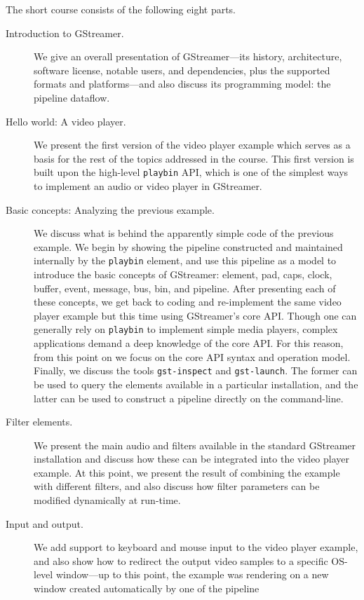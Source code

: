 \documentclass{sig-alternate-05-2015}
\begin{document}
The short course consists of the following eight parts.
\begin{description}
\item[Introduction to GStreamer.] We give an overall presentation of
  GStreamer---its history, architecture, software license, notable users,
  and dependencies, plus the supported formats and platforms---and also
  discuss its programming model: the pipeline dataflow.
\item[Hello world: A video player.]  We present the first version of the
  video player example which serves as a basis for the rest of the topics
  addressed in the course.  This first version is built upon the high-level
  \texttt{playbin} API, which is one of the simplest ways to implement an
  audio or video player in GStreamer.
\item[Basic concepts: Analyzing the previous example.] We discuss what is
  behind the apparently simple code of the previous example.  We begin by
  showing the pipeline constructed and maintained internally by the
  \texttt{playbin} element, and use this pipeline as a model to introduce
  the basic concepts of GStreamer: element, pad, caps, clock, buffer, event,
  message, bus, bin, and pipeline.  After presenting each of these concepts,
  we get back to coding and re-implement the same video player example but
  this time using GStreamer's core API.  Though one can generally rely on
  \texttt{playbin} to implement simple media players, complex applications
  demand a deep knowledge of the core API.  For this reason, from this point
  on we focus on the core API syntax and operation model.  Finally, we
  discuss the tools \texttt{gst-inspect} and \texttt{gst-launch}.  The
  former can be used to query the elements available in a particular
  installation, and the latter can be used to construct a pipeline directly
  on the command-line.
\item[Filter elements.] We present the main audio and filters available in
  the standard GStreamer installation and discuss how these can be
  integrated into the video player example.  At this point, we present the
  result of combining the example with different filters, and also discuss
  how filter parameters can be modified dynamically at run-time.
\item[Input and output.]  We add support to keyboard and mouse input to the
  video player example, and also show how to redirect the output video
  samples to a specific OS-level window---up to this point, the example was
  rendering on a new window created automatically by one of the pipeline

\end{description}
\end{document}
